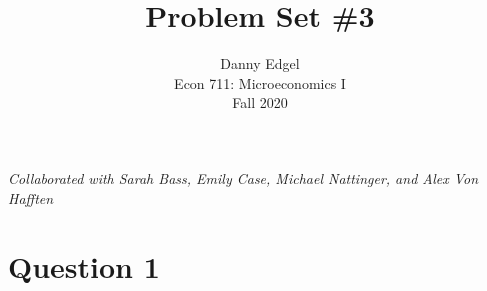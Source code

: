 \documentclass{article}
\begin{document}
\title{	Problem Set \#3 }
\author{ 	Danny Edgel 					\\ 
			Econ 711: Microeconomics I		\\
			Fall 2020						\\
		}
\maketitle\thispagestyle{empty}

\noindent\textit{Collaborated with Sarah Bass, Emily Case, Michael Nattinger, and Alex Von Hafften}


\section*{Question 1}
\end{document}
